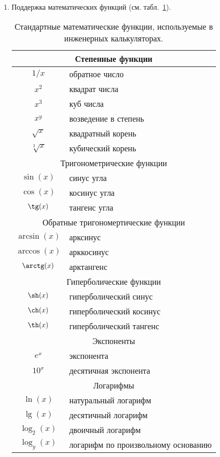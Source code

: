 \begin{enumerate}
  \item Поддержка математических функций (см. табл.~\ref{tab:1}).
    
\begin{table}
\caption{Стандартные математические функции, 
используемые в инженерных калькуляторах.}\label{tab:1}
\renewcommand{\arraystretch}{1.3}
\begin{tabular}{|c|l|}
 \hline
 \multicolumn{2}{|c|}{Степенные функции}
 \\ \hline
 $1/x$    & обратное число
 \\ \hline
 $x^2$    & квадрат числа
 \\ \hline
 $x^3$    & куб числа
 \\ \hline
 $x^y$    & возведение в степень
 \\ \hline
 $\sqrt{x}$& квадратный корень
 \\ \hline
 $\sqrt[3]{x}$ & кубический корень
 \\ \hline
 
 \multicolumn{2}{|c|}{Тригонометрические функции}
 \\ \hline
 $\sin(x)$ & синус угла
 \\ \hline
 $\cos(x)$ & косинус угла
 \\ \hline
 $\tg(x)$  & тангенс угла
 \\ \hline
 
 \multicolumn{2}{|c|}{Обратные тригономертические функции}
 \\ \hline
 $\arcsin(x)$ & арксинус
 \\ \hline
 $\arccos(x)$ & арккосинус
 \\ \hline
 $\arctg(x)$  & арктангенс
 \\ \hline
 
 \multicolumn{2}{|c|}{Гиперболические функции}
 \\ \hline
 $\sh(x)$ & гиперболический синус
 \\ \hline
 $\ch(x)$ & гиперболический косинус
 \\ \hline
 $\th(x)$ & гиперболический тангенс
 \\ \hline
 
 \multicolumn{2}{|c|}{Экспоненты}
 \\ \hline
 $e^x$  & экспонента
 \\ \hline
 $10^x$ & десятичная экспонента
 \\ \hline
       
 \multicolumn{2}{|c|}{Логарифмы}  
 \\ \hline
 $\ln(x)$    & натуральный логарифм
 \\ \hline
 $\lg(x)$    & десятичный логарифм
 \\ \hline
 $\log_2(x)$ & двоичный логарифм
 \\ \hline
 $\log_y(x)$ & логарифм по произвольному основанию
 \\ \hline
      

\end{tabular}
\end{table}
\end{enumerate}
